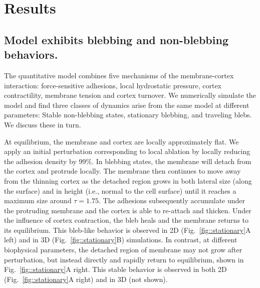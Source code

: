 

\section{Results}


\subsection{Model exhibits  blebbing and non-blebbing behaviors.}
The quantitative model combines five mechanisms of the membrane-cortex interaction: force-sensitive adhesions, local hydrostatic pressure, cortex contractility, membrane tension and cortex turnover. We numerically simulate the model and find three classes of dynamics arise from the same model at different parameters: Stable non-blebbing states, stationary blebbing, and traveling blebs. We discuss these in turn.

At equilibrium, the membrane and cortex are locally approximately flat. We apply an initial perturbation corresponding to local ablation by locally reducing the adhesion density by 99\%. In blebbing states, the membrane will detach from the cortex and protrude locally. The membrane  then continues to move away from the thinning cortex as the detached region grows in both lateral size (along the surface) and in height (i.e., normal to the cell surface) until it reaches a maximum size around $\tau=1.75$. The adhesions subsequently accumulate under the protruding membrane and the cortex is able to re-attach and thicken. Under the influence of cortex contraction, the bleb heals and the membrane returns to its equilibrium. This bleb-like behavior is observed in 2D (Fig.~\ref{fig::stationary}A left) and in 3D (Fig.~\ref{fig::stationary}B) simulations. 
In contrast, at different biophysical parameters, the detached region of membrane may not grow after perturbation, but instead directly and rapidly return to equilibrium, shown in Fig.~\ref{fig::stationary}A right. This stable behavior is observed in both 2D (Fig.~\ref{fig::stationary}A right) and in 3D (not shown). 

